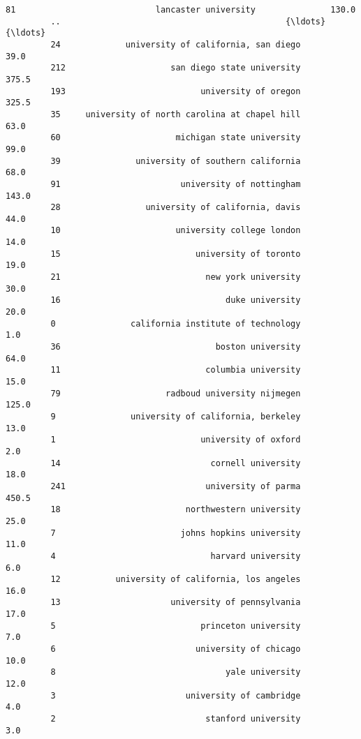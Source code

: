 \documentclass[11pt]{article}
\begin{document}
\begin{Verbatim}[commandchars=\\\{\}]
         81                            lancaster university               130.0   
         ..                                             {\ldots}                 {\ldots}   
         24             university of california, san diego                39.0   
         212                     san diego state university               375.5   
         193                           university of oregon               325.5   
         35     university of north carolina at chapel hill                63.0   
         60                       michigan state university                99.0   
         39               university of southern california                68.0   
         91                        university of nottingham               143.0   
         28                 university of california, davis                44.0   
         10                       university college london                14.0   
         15                           university of toronto                19.0   
         21                             new york university                30.0   
         16                                 duke university                20.0   
         0               california institute of technology                 1.0   
         36                               boston university                64.0   
         11                             columbia university                15.0   
         79                     radboud university nijmegen               125.0   
         9               university of california, berkeley                13.0   
         1                             university of oxford                 2.0   
         14                              cornell university                18.0   
         241                            university of parma               450.5   
         18                         northwestern university                25.0   
         7                         johns hopkins university                11.0   
         4                               harvard university                 6.0   
         12           university of california, los angeles                16.0   
         13                      university of pennsylvania                17.0   
         5                             princeton university                 7.0   
         6                            university of chicago                10.0   
         8                                  yale university                12.0   
         3                          university of cambridge                 4.0   
         2                              stanford university                 3.0   
         

\end{Verbatim}
\end{document}
